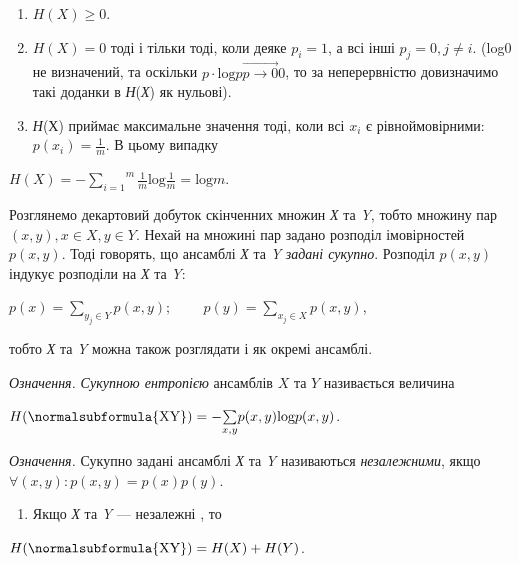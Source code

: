 \liststyleWWviiiNumxxxix
\begin{enumerate}
\item  ${H(X)\ge 0}$.
\item  ${H(X)=0}$ тоді і тільки тоді, коли деяке  ${p_{{i}}=1}$, а всі інші 
${p_{{j}}=0,j\neq i}$. (log0 не визначений, та оскільки  ${p\cdot
\text{log}p\overrightarrow{{{p\rightarrow 0}}}0}$, то за неперервністю
довизначимо такі доданки в \textit{Н}(\textit{Х}) як нульові).
\item \textit{Н}(Х) приймає максимальне значення тоді, коли всі  ${x_{{i}}}$ є
рівноймовірними:  ${p(x_{{i}})=\frac{1}{m}}$. В цьому випадку
\end{enumerate}
{\centering
 ${H(X)=-\overset{{m}}{\underset{{i=1}}{\sum
}}{\frac{{1}}{{m}}\text{log}\frac{1}{m}}=\text{log}m}$.
\par}


\bigskip

Розглянемо декартовий добуток скінченних множин \textit{Х} та \textit{Y}, тобто
множину пар  ${(x,y),x\in X,y\in Y}$. Нехай на множині пар задано розподіл
імовірностей  ${p(x,y)}$. Тоді говорять, що ансамблі \textit{Х} та \textit{Y}
\textit{задані сукупно}. Розподіл  ${p(x,y)}$ індукує розподіли на \textit{Х}
та \textit{Y}:

{\centering
 ${p(x)=\underset{{y_{{j}}\in Y}}{\sum
}{p(x,y)};\;\;\;\;\;\;\;\;p(y)=\underset{x_{{j}}\in X}{\sum }{p(x,y)}}$,
\par}

тобто \textit{Х} та \textit{Y} можна також розглядати і як окремі ансамблі.

\textit{Означення.} \textit{Сукупною ентропією} ансамблів  ${X}$ та  ${Y}$
називається величина

{\centering
 ${H(\normalsubformula{\text{XY}})=-\underset{{x,y}}{\sum
}{p(x,y)\text{log}p(x,y)}}$.
\par}

\textit{Означення.} Сукупно задані ансамблі \textit{Х} та \textit{Y} називаються
\textit{незалежними}, якщо  ${\forall (x,y):p(x,y)=p(x)p(y)}$.

\liststyleWWviiiNumxxxix
\setcounter{saveenum}{\value{enumi}}
\begin{enumerate}
\setcounter{enumi}{\value{saveenum}}
\item Якщо \textit{Х} та \textit{Y} --- незалежні , то
\end{enumerate}
{\centering
 ${H(\normalsubformula{\text{XY}})=H(X)+H(Y)}$.
\par}

